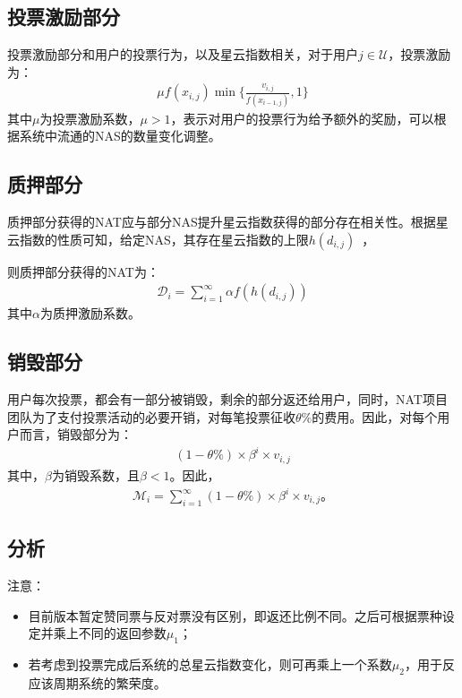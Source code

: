 \subsection{投票激励部分}
投票激励部分和用户的投票行为，以及星云指数相关，对于用户$j \in \mathcal{U}$，投票激励为：
\begin{align}
\mu f(x_{i,j}) \min\{\frac{v_{i,j}}{f(x_{i-1,j})},1\}
\end{align}
\noindent 其中$\mu$为投票激励系数，$\mu > 1$，表示对用户的投票行为给予额外的奖励，可以根据系统中流通的NAS的数量变化调整。

\subsection{质押部分}
质押部分获得的NAT应与部分NAS提升星云指数获得的部分存在相关性。根据星云指数的性质可知，给定NAS，其存在星云指数的上限$h(d_{i,j})$~\cite{ImproveNR}，

则质押部分获得的NAT为：
\begin{align}
\mathcal{D}_i = \sum_{i=1}^{\infty}\alpha f(h(d_{i,j}))
\end{align}
\noindent 其中$\alpha$为质押激励系数。


\subsection{销毁部分}
\label{burn}
用户每次投票，都会有一部分被销毁，剩余的部分返还给用户，同时，NAT项目团队为了支付投票活动的必要开销，对每笔投票征收$\theta\%$的费用。因此，对每个用户而言，销毁部分为：
\begin{align}
(1-\theta\%) \times \beta^i \times v_{i,j}
\end{align}
\noindent 其中，$\beta$为销毁系数，且$\beta < 1$。因此，
\begin{align}
    \mathcal{M}_i = \sum_{i=1}^{\infty} (1-\theta\%) \times \beta^i \times v_{i,j} 。
\end{align}

\subsection{分析}

注意：
\begin{itemize}
\item 目前版本暂定赞同票与反对票没有区别，即返还比例不同。之后可根据票种设定并乘上不同的返回参数$\mu_1$；
\item 若考虑到投票完成后系统的总星云指数变化，则可再乘上一个系数$\mu_2$，用于反应该周期系统的繁荣度。
\end{itemize}


